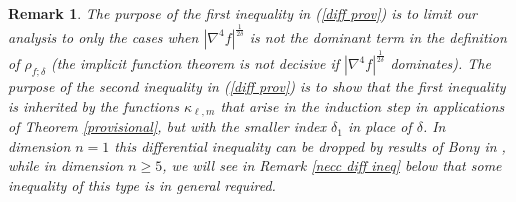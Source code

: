 \documentclass{amsart}
\theoremstyle{plain}
\newtheorem{remark}[theorem]{Remark}
\numberwithin{equation}{section}
\begin{document}
\begin{remark}
The purpose of the first inequality in (\ref{diff prov}) is to limit our
analysis to only the cases when $\left\vert \nabla ^{4}f\right\vert ^{\frac{1%
}{2\delta }}$ is \emph{not} the dominant term in the definition of $\rho
_{f;\delta }$ (the implicit function theorem is \emph{not} decisive if $%
\left\vert \nabla ^{4}f\right\vert ^{\frac{1}{2\delta }}$ dominates). The
purpose of the second inequality in (\ref{diff prov}) is to show that the
first inequality is inherited by the functions $\kappa _{\ell ,m}$ that
arise in the induction step in applications of Theorem \ref{provisional},
but with the smaller index $\delta _{1}$ in place of $\delta $. In dimension 
$n=1$ this differential inequality can be dropped by results of Bony in \cite%
{Bon}, while in dimension $n\geq 5$, we will see in Remark \ref{necc diff
ineq} below that some inequality of this type is in general required.
\end{remark}
\end{document}
